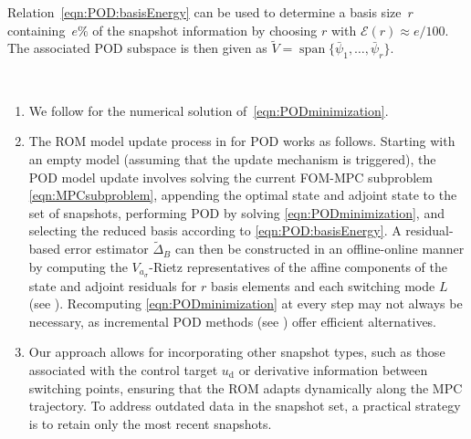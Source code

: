 \documentclass[reqno]{amsart}
\DeclareMathOperator{\spann}{span}
\newcommand{\desired}[1]{#1_{\mathrm{d}}}
\newcommand{\inpVarDes}{\desired{u}}
\newcommand{\nrModes}{L}
\newcommand{\reduce}[1]{\tilde{#1}}
\newcommand{\Vred}{\reduce{V}}
\newcommand{\BoundControlBtil}{\tilde\Delta_{B}}
\newcommand{\stateDimRed}{r}
\newcommand{\basis}{\psi}
\newcommand{\PODbasis}{\bar{\basis}}
\newcommand{\calE}{\mathcal{E}}
\newcommand{\abbr}[1]{\textsf{#1}\xspace}
\newcommand{\FOM}{\abbr{FOM}}
\newcommand{\ROM}{\abbr{ROM}}
\newcommand{\MPC}{\abbr{MPC}}
\newcommand{\POD}{\abbr{POD}} %
\begin{document}
Relation~\eqref{eqn:POD:basisEnergy} can be used to determine a basis size~$\stateDimRed$ containing~$e\%$ of the snapshot information by choosing $\stateDimRed$ with $\calE(\stateDimRed)\approx {e}/{100}$. The associated \POD subspace is then given as $\Vred = \spann\{\PODbasis_1,\ldots,\PODbasis_{\stateDimRed}\}$.
%
\begin{remark}\label{rem: extending the ROM POD}
%
\,
\begin{enumerate}
    \item We follow \cite{locke2021new} for the numerical solution of~\eqref{eqn:PODminimization}.
    \item The \ROM model update process in  for \POD works as follows. Starting with an empty model (assuming that the update mechanism is triggered), the \POD model update involves solving the current \FOM-\MPC subproblem \eqref{eqn:MPCsubproblem}, appending the optimal state and adjoint state to the set of snapshots, performing \POD by solving \eqref{eqn:PODminimization}, and selecting the reduced basis according to \eqref{eqn:POD:basisEnergy}. A residual-based error estimator $\BoundControlBtil$ can then be constructed in an offline-online manner by computing the $V_{a_\sigma}$-Rietz representatives of the affine components of the state and adjoint residuals for $\stateDimRed$ basis elements and each switching mode $\nrModes$ (see \cite[Sec.~4.2.5]{Hesthaven2016}). Recomputing \eqref{eqn:PODminimization} at every step may not always be necessary, as incremental \POD methods (see \cite{FAREED2019223}) offer efficient alternatives.
    \item Our approach allows for incorporating other snapshot types, such as those associated with the control target $\inpVarDes$ or derivative information between switching points, ensuring that the \ROM adapts dynamically along the \MPC trajectory. To address outdated data in the snapshot set, a practical strategy is to retain only the most recent snapshots.
\end{enumerate}
\end{remark}
%
\end{document}
